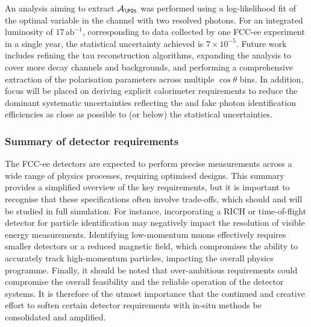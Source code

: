An analysis aiming to extract $\mathcal{A}_{\PGt}$ was performed using a log-likelihood fit of the optimal variable in the \PGr channel with two resolved photons. 
For an integrated luminosity of $17\,\text{ab}^{-1}$, corresponding to data collected by one FCC-ee experiment in a single year, 
the statistical uncertainty achieved is $7 \times 10^{-5}$. 
Future work includes refining the tau reconstruction algorithms, expanding the analysis to cover more decay channels and backgrounds, 
and performing a comprehensive extraction of the polarisation parameters across multiple $\cos\theta$ bins. 
In addition, focus will be placed on deriving explicit calorimeter requirements to reduce 
the dominant systematic uncertainties reflecting the \PGpz and fake photon identification efficiencies 
as close as possible to (or below) the statistical uncertainties.

\subsubsection{Summary of detector requirements}

The FCC-ee detectors are expected to perform precise measurements across a wide range of physics processes, 
requiring optimised designs. 
This summary provides a simplified overview of the key requirements, but it is important to recognise that these specifications often involve trade-offs, 
which should and will be studied in full simulation. 
For instance, incorporating a RICH or time-of-flight detector for particle identification may negatively impact the resolution of visible energy measurements. 
Identifying low-momentum muons effectively requires smaller detectors or a reduced magnetic field, 
which compromises the ability to accurately track high-momentum particles, impacting the overall physics programme. 
Finally, it should be noted that over-ambitious requirements could compromise the overall feasibility and the reliable operation of the detector systems. 
It is therefore of the utmost importance that the continued and creative effort to soften certain detector requirements with in-situ methods be consolidated and amplified.


